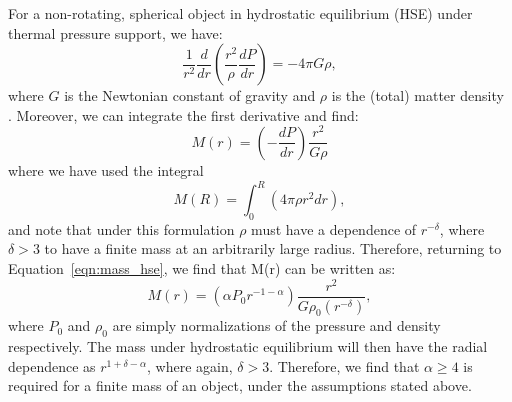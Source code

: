 \documentclass[onecolumn,traditabstract]{aa}
\begin{document}
For a non-rotating, spherical object in hydrostatic equilibrium (HSE) under thermal pressure support, we have:
\begin{equation}
  \frac{1}{r^2}\frac{d}{dr}\left( \frac{r^2}{\rho}\frac{dP}{dr} \right) = -4\pi G \rho,
  \label{eqn:landau_hse}
\end{equation}
where $G$ is the Newtonian constant of gravity and $\rho$ is the (total) matter density \citep{landau1959}.
Moreover, we can integrate the first derivative and find:
\begin{equation}
  M(r) = \left( - \frac{dP}{dr} \right) \frac{r^2}{G \rho}
  \label{eqn:mass_hse}
\end{equation}
where we have used the integral
\begin{equation}
  M(R) = \int_{0} ^R (4 \pi \rho r^2 dr),
  \label{eqn:mass_def}
\end{equation}
and note that under this formulation $\rho$ must have a dependence of $r^{-\delta}$, where $\delta > 3$ to have a finite mass
at an arbitrarily large radius. Therefore, returning to Equation~\ref{eqn:mass_hse}, we find that M(r) can be written as:
\begin{equation}
  M(r) =   \left(\alpha P_0 r^{-1-\alpha} \right) \frac{r^2}{G \rho_0 (r^{-\delta})},
\end{equation}
where $P_0$ and $\rho_0$ are simply normalizations of the pressure and density respectively. The mass under hydrostatic
equilibrium will then have the radial dependence as $r^{1+\delta - \alpha}$, where again, $\delta > 3$. Therefore, we find
that $\alpha \ge 4$ is required for a finite mass of an object, under the assumptions stated above.




%

\label{references}
\end{document}
